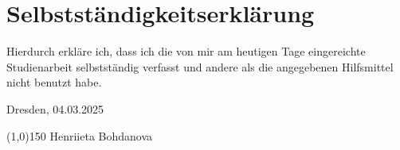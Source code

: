 \chapter*{Selbstständigkeitserklärung}


	

Hierdurch erkläre ich, dass ich die von mir am heutigen Tage eingereichte Studienarbeit selbstständig verfasst und andere als die angegebenen Hilfsmittel nicht benutzt habe.
		
\vspace{5mm}
	
Dresden, 04.03.2025
		
\vspace{15mm}
	
\begin{minipage}[t]{5,5cm}
	\line(1,0){150}
	\vspace{1em}
	Henriieta Bohdanova
\end{minipage}\hspace{4cm}



\cleardoublepage